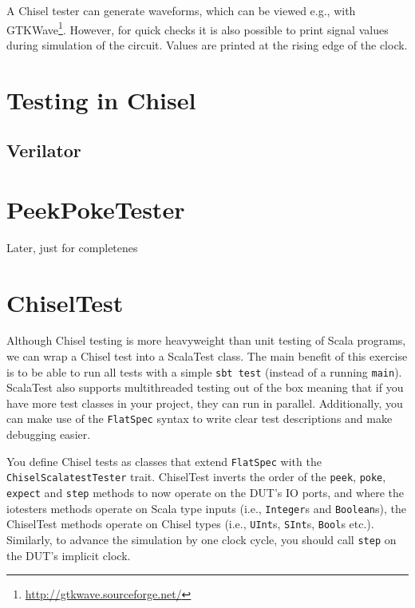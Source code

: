 \documentclass[%
    10pt,
    headinclude, footexclude,
    openright, %
    notitlepage,
    cleardoubleempty,
    headsepline,
    pointlessnumbers,
    bibtotoc, idxtotoc,
    ]{scrbook}
\newcommand{\code}[1]{{\small{\texttt{#1}}}}
\newcommand{\todo}[1]{{\emph{TODO: #1}}}
\newcommand{\myref}[2]{\href{#1}{#2}}
\renewcommand{\myref}[2]{{#2}{\footnote{\url{#1}}}}
\renewcommand{\todo}[1]{}
\begin{document}
A Chisel tester can generate waveforms, which can be viewed e.g., with \myref{http://gtkwave.sourceforge.net/}{GTKWave}.
However, for quick checks it is also possible to print signal values during simulation of the circuit.
Values are printed at the rising edge of the clock.


\section{Testing in Chisel}


\subsection{Verilator}





\section{PeekPokeTester}

Later, just for completenes

\todo{Rewrite this}


\section{ChiselTest}


\noindent Although Chisel testing is more heavyweight than unit testing of Scala programs,
we can wrap a Chisel test into a ScalaTest class. The main benefit of this exercise is to 
be able to run all tests with a simple \code{sbt test} (instead of a running \code{main}). 
ScalaTest also supports multithreaded testing out of the box meaning that if you have more 
test classes in your project, they can run in parallel. Additionally, you can make use of 
the \code{FlatSpec} syntax to write clear test descriptions and make debugging easier.

\noindent You define Chisel tests as classes that extend \code{FlatSpec} with 
the \code{ChiselScalatestTester} trait. ChiselTest inverts the order of the \code{peek}, 
\code{poke}, \code{expect} and \code{step} methods to now operate on the DUT's IO ports, 
and where the iotesters methods operate on Scala type inputs (i.e., \code{Integer}s and 
\code{Boolean}s), the ChiselTest methods operate on Chisel types (i.e., \code{UInt}s, 
\code{SInt}s, \code{Bool}s etc.). Similarly, to advance the simulation by one clock cycle, 
you should call \code{step} on the DUT's implicit clock.
\end{document}
